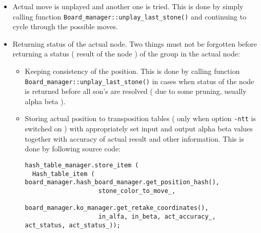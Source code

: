 \begin{itemize}
\item Actual move is unplayed and another one is tried. This is done by simply calling function {\tt Board\_\-manager::unplay\_\-last\_\-stone()} and continuing to cycle through the possible moves.\item Returning status of the actual node. Two things must not be forgotten before returning a status ( result of the node ) of the group in the actual node:\begin{itemize}
\item Keeping consistency of the position. This is done by calling function {\tt Board\_\-manager::unplay\_\-last\_\-stone()} in cases when status of the node is returned before all son's are resolved ( due to some pruning, usually alpha beta ).\item Storing actual position to transposition tables ( only when option {\tt -ntt} is switched on ) with appropriately set input and output alpha beta values together with accuracy of actual result and other information. This is done by following source code: 

\footnotesize\begin{verbatim}hash_table_manager.store_item ( 
  Hash_table_item ( board_manager.hash_board_manager.get_position_hash(),
                    stone_color_to_move_,
                    board_manager.ko_manager.get_retake_coordinates(),
                    in_alfa, in_beta, act_accuracy_, act_status, act_status_)); 
\end{verbatim}
\normalsize
\end{itemize}
\end{itemize}
